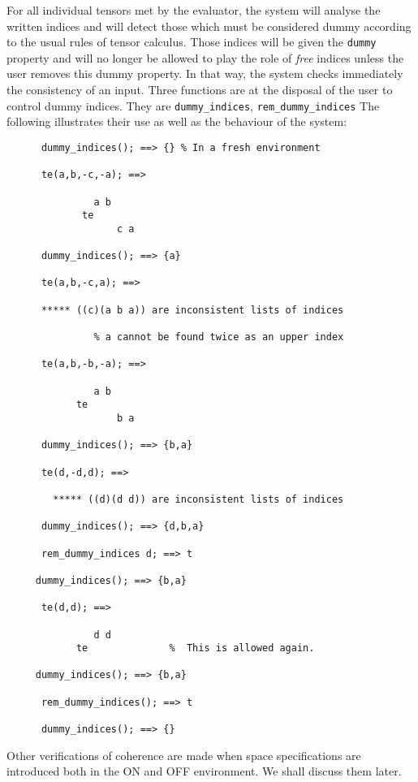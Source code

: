 
\hypertarget{operator:DUMMY_INDICES}{}
\hypertarget{command:REM_DUMMY_INDICES}{}
For all individual tensors met by the evaluator, the system will analyse
the written indices and will detect those which must be considered dummy
according to the usual rules of tensor calculus. Those indices will be given
the \texttt{dummy} property and will no longer be allowed to play the role
of \emph{free} indices unless the user removes this dummy property.
In that way, the system checks immediately the consistency of an input.
Three functions are at the disposal of the user to control dummy indices.
They are \texttt{dummy\_indices},
\texttt{rem\_dummy\_indices}
The following illustrates their use as well as the behaviour of the
system:
\begin{verbatim}
      dummy_indices(); ==> {} % In a fresh environment

      te(a,b,-c,-a); ==>

               a b
             te
                   c a

      dummy_indices(); ==> {a}

      te(a,b,-c,a); ==>

      ***** ((c)(a b a)) are inconsistent lists of indices

               % a cannot be found twice as an upper index

      te(a,b,-b,-a); ==>

               a b
            te
                   b a

      dummy_indices(); ==> {b,a}

      te(d,-d,d); ==>

        ***** ((d)(d d)) are inconsistent lists of indices

      dummy_indices(); ==> {d,b,a}

      rem_dummy_indices d; ==> t

     dummy_indices(); ==> {b,a}

      te(d,d); ==>

               d d
            te              %  This is allowed again.

     dummy_indices(); ==> {b,a}

      rem_dummy_indices(); ==> t

      dummy_indices(); ==> {}
\end{verbatim}
Other verifications of coherence are made when space specifications
are introduced both in the ON and OFF  environment. We shall
discuss them later.

